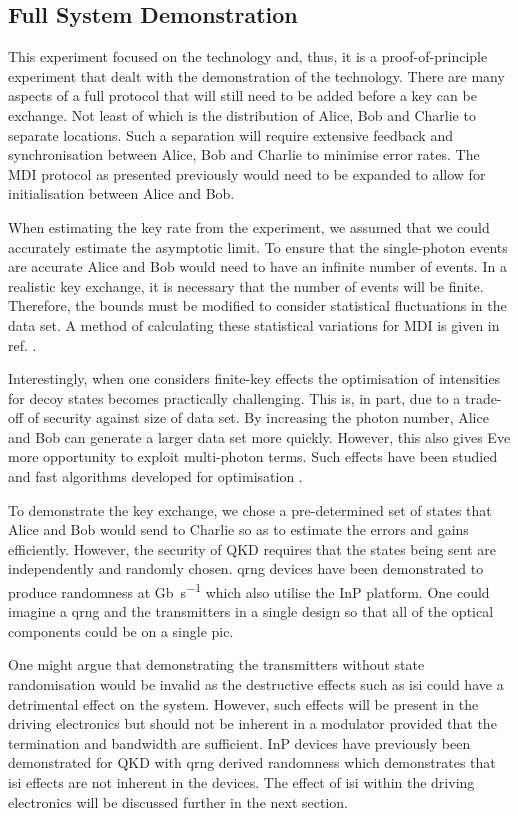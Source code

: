 \subsection{Full System Demonstration}

This experiment focused on the technology and, thus, it is a proof-of-principle experiment that dealt with the demonstration of the technology. There are many aspects of a full protocol that will still need to be added before a key can be exchange. Not least of which is the distribution of Alice, Bob and Charlie to separate locations. Such a separation will require extensive feedback and synchronisation between Alice, Bob and Charlie to minimise error rates. The \ac{MDI} protocol as presented previously would need to be expanded to allow for initialisation between Alice and Bob. 

When estimating the key rate from the experiment, we assumed that we could accurately estimate the asymptotic limit. To ensure that the single-photon events are accurate Alice and Bob would need to have an infinite number of events. In a realistic key exchange, it is necessary that the number of events will be finite. Therefore, the bounds must be modified to consider statistical fluctuations in the data set. A method of calculating these statistical variations for \ac{MDI} is given in ref. \cite{zhou2016}.

Interestingly, when one considers finite-key effects the optimisation of intensities for decoy states becomes practically challenging. This is, in part, due to a trade-off of security against size of data set. By increasing the photon number, Alice and Bob can generate a larger data set more quickly. However, this also gives Eve more opportunity to exploit multi-photon terms. Such effects have been studied and fast algorithms developed for optimisation \cite{Wang2019asymmetric}.

To demonstrate the key exchange, we chose a pre-determined set of states that Alice and Bob would send to Charlie so as to estimate the errors and gains efficiently. However, the security of \ac{QKD} requires that the states being sent are independently and randomly chosen. \Ac{qrng} devices have been demonstrated to produce randomness at \si{Gb\per\second} \cite{raffaelli2018generation, Abellan2016, herrero2017quantum} which also utilise the \ac{InP} platform. One could imagine a \ac{qrng} and the transmitters in a single design so that all of the optical components could be on a single \ac{pic}.

One might argue that demonstrating the transmitters without state randomisation would be invalid as the destructive effects such as \ac{isi} could have a detrimental effect on the system. However, such effects will be present in the driving electronics but should not be inherent in a modulator provided that the termination and bandwidth are sufficient. \Ac{InP} devices have previously been demonstrated for \ac{QKD} with \ac{qrng} derived randomness which demonstrates that \ac{isi} effects are not inherent in the devices. The effect of \ac{isi} within the driving electronics will be discussed further in the next section.


